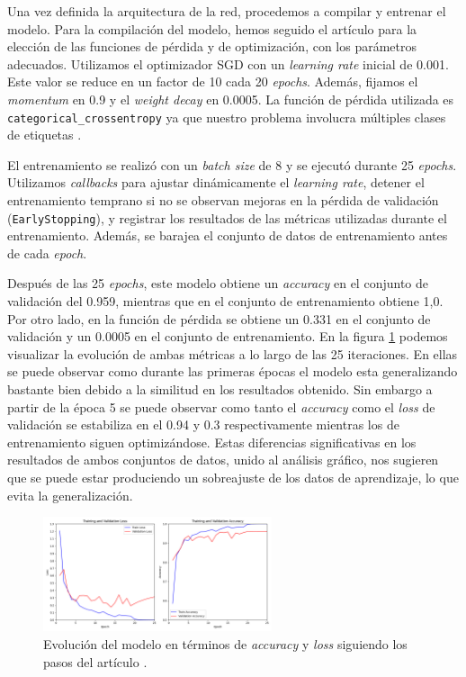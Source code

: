 Una vez definida la arquitectura de la red, procedemos a compilar y entrenar el modelo. Para la compilación del modelo, hemos seguido el artículo \citep{kalash2018malware} para la elección de las funciones de pérdida y de optimización, con los parámetros adecuados. Utilizamos el optimizador SGD con un \textit{learning rate} inicial de 0.001. Este valor se reduce en un factor de 10 cada 20 \textit{epochs}. Además, fijamos el \textit{momentum} en 0.9 y el \textit{weight decay} en 0.0005. La función de pérdida utilizada es \lstinline|categorical_crossentropy| ya que nuestro problema involucra múltiples clases de etiquetas \citep{categoriCE}.

El entrenamiento se realizó con un \textit{batch size} de 8 y se ejecutó durante 25 \textit{epochs}. Utilizamos \textit{callbacks} para ajustar dinámicamente el \textit{learning rate}, detener el entrenamiento temprano si no se observan mejoras en la pérdida de validación (\lstinline|EarlyStopping|), y registrar los resultados de las métricas utilizadas durante el entrenamiento. Además, se barajea el conjunto de datos de entrenamiento antes de cada \textit{epoch}. 


Después de las 25 \textit{epochs}, este modelo obtiene un \textit{accuracy} en el conjunto de validación del 0.959, mientras que en el conjunto de entrenamiento obtiene 1,0. Por otro lado, en la función de pérdida se obtiene un 0.331 en el conjunto de validación y un 0.0005 en el conjunto de entrenamiento. En la figura \ref{img: dropout0} podemos visualizar la evolución de ambas métricas a lo largo de las 25 iteraciones. En ellas se puede observar como durante las primeras épocas el modelo esta generalizando bastante bien debido a la similitud en los resultados obtenido. Sin embargo a partir de la época 5 se puede observar como tanto el \textit{accuracy} como el \textit{loss} de validación se estabiliza en el 0.94 y 0.3 respectivamente mientras los de entrenamiento siguen optimizándose. Estas diferencias significativas en los resultados de ambos conjuntos de datos, unido al análisis gráfico, nos sugieren que se puede estar produciendo un sobreajuste de los datos de aprendizaje, lo que evita la generalización. 

\begin{figure}[h]
    \begin{center}
    \includegraphics[width=0.6\textwidth]{img/malware_classifier_dropout0.png}
    \end{center}
    \caption{Evolución del modelo en términos de \textit{accuracy} y \textit{loss} siguiendo los pasos del artículo \citep{kalash2018malware}.}
    \label{img: dropout0}
\end{figure}

